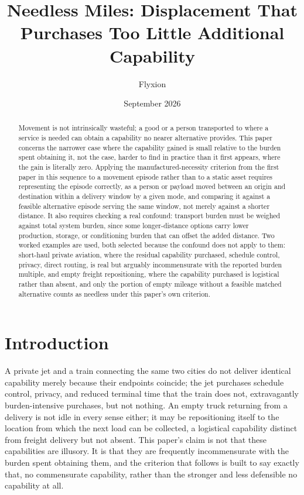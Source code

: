 \documentclass[11pt]{article}
\title{Needless Miles: Displacement That Purchases Too Little Additional Capability}
\author{Flyxion}
\affil{Independent Researcher}
\date{September 2026}
\begin{document}
\maketitle

\begin{abstract}
Movement is not intrinsically wasteful; a good or a person transported to where a service is needed can obtain a capability no nearer alternative provides. This paper concerns the narrower case where the capability gained is small relative to the burden spent obtaining it, not the case, harder to find in practice than it first appears, where the gain is literally zero. Applying the manufactured-necessity criterion from the first paper in this sequence to a movement episode rather than to a static asset requires representing the episode correctly, as a person or payload moved between an origin and destination within a delivery window by a given mode, and comparing it against a feasible alternative episode serving the same window, not merely against a shorter distance. It also requires checking a real confound: transport burden must be weighed against total system burden, since some longer-distance options carry lower production, storage, or conditioning burden that can offset the added distance. Two worked examples are used, both selected because the confound does not apply to them: short-haul private aviation, where the residual capability purchased, schedule control, privacy, direct routing, is real but arguably incommensurate with the reported burden multiple, and empty freight repositioning, where the capability purchased is logistical rather than absent, and only the portion of empty mileage without a feasible matched alternative counts as needless under this paper's own criterion.
\end{abstract}

\section{Introduction}

A private jet and a train connecting the same two cities do not deliver identical capability merely because their endpoints coincide; the jet purchases schedule control, privacy, and reduced terminal time that the train does not, extravagantly burden-intensive purchases, but not nothing. An empty truck returning from a delivery is not idle in every sense either; it may be repositioning itself to the location from which the next load can be collected, a logistical capability distinct from freight delivery but not absent. This paper's claim is not that these capabilities are illusory. It is that they are frequently incommensurate with the burden spent obtaining them, and the criterion that follows is built to say exactly that, no commensurate capability, rather than the stronger and less defensible no capability at all.
\end{document}
